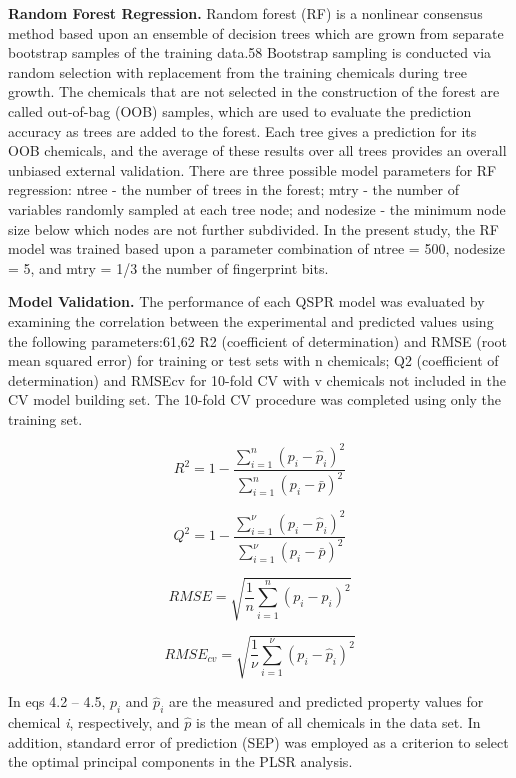 \documentclass[10pt, letter]{report}
\renewcommand{\=}{\, =\, }
\newcommand{\+}{\, +\, }
\renewcommand{\-}{\, -\, }
\begin{document}
\textbf{Random Forest Regression.} Random forest (RF) is a
nonlinear consensus method based upon an ensemble of
decision trees which are grown from separate bootstrap samples
of the training data.58 Bootstrap sampling is conducted via
random selection with replacement from the training chemicals
during tree growth. The chemicals that are not selected in the
construction of the forest are called out-of-bag (OOB) samples,
which are used to evaluate the prediction accuracy as trees are
added to the forest. Each tree gives a prediction for its OOB
chemicals, and the average of these results over all trees
provides an overall unbiased external validation. There are three
possible model parameters for RF regression: ntree - the
number of trees in the forest; mtry - the number of variables
randomly sampled at each tree node; and nodesize - the
minimum node size below which nodes are not further
subdivided. In the present study, the RF model was trained
based upon a parameter combination of ntree = 500, nodesize
= 5, and mtry = 1/3 the number of fingerprint bits.

\textbf{Model Validation.} The performance of each QSPR model
was evaluated by examining the correlation between the
experimental and predicted values using the following
parameters:61,62 R2 (coefficient of determination) and RMSE
(root mean squared error) for training or test sets with n
chemicals; Q2 (coefficient of determination) and RMSEcv for
10-fold CV with v chemicals not included in the CV model
building set. The 10-fold CV procedure was completed using
only the training set.

\begin{equation}
R^{2} = 1 - \frac{\sum_{i = 1}^n(p_{i}-\hat{p}_{i})^{2}}{\sum_{i = 1}^n(p_{i}-\bar{p})^{2}}
\end{equation}

\begin{equation}
Q^{2} = 1 - \frac{\sum_{i = 1}^\nu(p_{i}-\hat{p}_{i})^{2}}{\sum_{i = 1}^\nu(p_{i}-\bar{p})^{2}}
\end{equation}

\begin{equation}
RMSE = \sqrt{\frac{1}{n}\sum_{i = 1}^n(p_{i}-\hat{p}_{i})^{2}}
\end{equation}

\begin{equation}
RMSE_{cv} = \sqrt{\frac{1}{\nu}\sum_{i = 1}^\nu(p_{i}-\hat{p}_{i})^{2}}
\end{equation}

In eqs 4.2 -- 4.5, \(p_{i}\) and \(\hat{p}_{i}\)
are the measured and predicted property
values for chemical \textit{i}, respectively, and \( \hat{p} \) is the mean of all
chemicals in the data set. In addition, standard error of
prediction (SEP) was employed as a criterion to select the
optimal principal components in the PLSR analysis.
\end{document}

